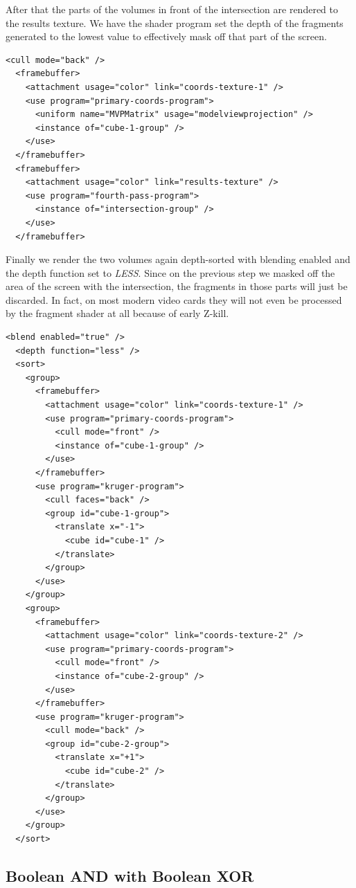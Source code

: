 \documentclass{article}
\begin{document}
After that the parts of the volumes in front of the intersection are rendered to
the results texture.  We have the shader program set the depth of the fragments
generated to the lowest value to effectively mask off that part of the screen.

\begin{Verbatim}[fontsize=\small]
  <cull mode="back" />
  <framebuffer>
    <attachment usage="color" link="coords-texture-1" />
    <use program="primary-coords-program">
      <uniform name="MVPMatrix" usage="modelviewprojection" />
      <instance of="cube-1-group" />
    </use>
  </framebuffer>
  <framebuffer>
    <attachment usage="color" link="results-texture" />
    <use program="fourth-pass-program">
      <instance of="intersection-group" />
    </use>
  </framebuffer>
\end{Verbatim}

Finally we render the two volumes again depth-sorted with blending enabled and
the depth function set to \emph{LESS}.  Since on the previous step we masked off
the area of the screen with the intersection, the fragments in those parts will
just be discarded.  In fact, on most modern video cards they will not even be
processed by the fragment shader at all because of early Z-kill.

\begin{Verbatim}[fontsize=\small]
  <blend enabled="true" />
  <depth function="less" />
  <sort>
    <group>
      <framebuffer>
        <attachment usage="color" link="coords-texture-1" />
        <use program="primary-coords-program">
          <cull mode="front" />
          <instance of="cube-1-group" />
        </use>
      </framebuffer>
      <use program="kruger-program">
        <cull faces="back" />
        <group id="cube-1-group">
          <translate x="-1">
            <cube id="cube-1" />
          </translate>
        </group>
      </use>
    </group>
    <group>
      <framebuffer>
        <attachment usage="color" link="coords-texture-2" />
        <use program="primary-coords-program">
          <cull mode="front" />
          <instance of="cube-2-group" />
        </use>
      </framebuffer>
      <use program="kruger-program">
        <cull mode="back" />
        <group id="cube-2-group">
          <translate x="+1">
            <cube id="cube-2" />
          </translate>
        </group>
      </use>
    </group>
  </sort>
\end{Verbatim}

\subsection{Boolean AND with Boolean XOR}
\end{document}
